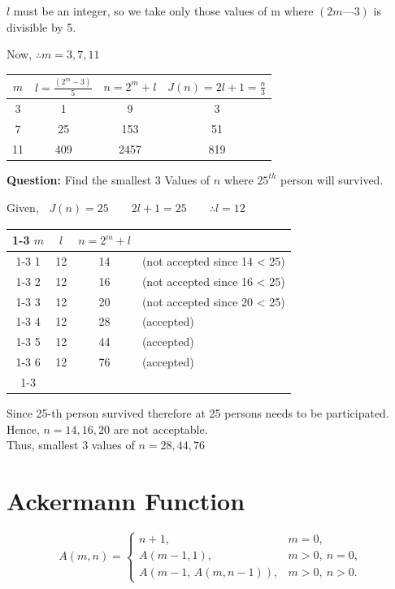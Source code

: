 $l$ must be an integer, so we take only those values of m where $(2m — 3)$ is divisible by 5.

Now, $\therefore m = 3, 7, 11$

\begin{tabular}{|c|c|c|c|}
   \hline $m$
   & $l = \frac{(2^m-3)}{5}$ & $n=2^m+l$ & $J(n)=2l+1 = \frac{n}{3}$ \\
   \hline 3 & 1 & 9 & 3 \\
   \hline 7 & 25 & 153 & 51 \\
   \hline 11 & 409 & 2457 & 819 \\\hline

\end{tabular}

\pagebreak
\vspace{4em}
\textbf{Question:} Find the smallest 3 Values of $n$ where $25^{th}$ person will survived.

Given,\ 
$\begin{aligned}
   J(n) = 25 \qquad
   2l+1 = 25 \qquad
   \therefore l = 12 \qquad
\end{aligned}$

\begin{tabular}{|c|c|c|l}
   \cline{1-3}
   $m$ & $l$ & $n=2^m+l$
   \\\cline{1-3}
   1 & 12 & 14 & (not accepted since 14 < 25)\\\cline{1-3}
   2 & 12 & 16 & (not accepted since 16 < 25)\\\cline{1-3}
   3 & 12 & 20 & (not accepted since 20 < 25)\\\cline{1-3}
   4 & 12 & 28 & (accepted)\\\cline{1-3}
   5 & 12 & 44 & (accepted)\\\cline{1-3}
   6 & 12 & 76 & (accepted)\\\cline{1-3}
\end{tabular}

Since 25-th person survived therefore at 25 persons needs to be participated.\\[0.5em]
Hence, $n=14,16,20$ are not acceptable.\\[0.5em]
Thus, smallest 3 values of $n=28,44,76$

\section{Ackermann Function}

\[
A(m,n) =
\begin{cases}
n+1, & m=0,\\[4pt]
A(m-1,1), & m>0,\ n=0,\\[4pt]
A(m-1,\,A(m,n-1)), & m>0,\ n>0.
\end{cases}
\]

